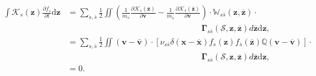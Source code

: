 \documentclass[preprint,12pt]{elsarticle}
\theoremstyle{definition}
\begin{document}
\begin{align*}
\int \mathcal{K}_s (\boldsymbol{z}) \frac{\partial f_s}{\partial t} \mathrm{d} \boldsymbol{z} &= \sum_{s, \bar{s}} \frac{1}{2} \iint\left(\frac{1}{m_{s}} \frac{\partial \mathcal{K}_s (\boldsymbol{z})}{\partial \boldsymbol{v}}-\frac{1}{m_{\bar{s}}} \frac{\partial \mathcal{K}_{\bar{s}}(\overline{\boldsymbol{z}})}{\partial \overline{\boldsymbol{v}}}\right) \cdot \mathbb{W}_{s \bar{s}}(\boldsymbol{z}, \overline{\boldsymbol{z}}) \cdot \\
&\qquad\qquad\qquad\qquad\qquad\qquad\qquad\qquad\boldsymbol{\Gamma}_{s \bar{s}}(\mathcal{S}, \boldsymbol{z}, \overline{\boldsymbol{z}}) d \overline{\boldsymbol{z}} \mathrm{d} \boldsymbol{z}, \\
&= \sum_{s, \bar{s}} \frac{1}{2} \iint\left(\boldsymbol{v} - \boldsymbol{\bar{v}} \right) \cdot \left[ \nu_{s \bar{s}} \delta(\boldsymbol{x}-\overline{\boldsymbol{x}}) f_{s}(\boldsymbol{z}) f_{\bar{s}}(\overline{\boldsymbol{z}}) \mathbb{Q}(\boldsymbol{v}-\overline{\boldsymbol{v}}) \right] \cdot \\
&\qquad\qquad\qquad\qquad\qquad\qquad\qquad\qquad\boldsymbol{\Gamma}_{s \bar{s}}(\mathcal{S}, \boldsymbol{z}, \overline{\boldsymbol{z}}) d \overline{\boldsymbol{z}} \mathrm{d} \boldsymbol{z}, \\
&= 0.
\end{align*}
\end{document}
